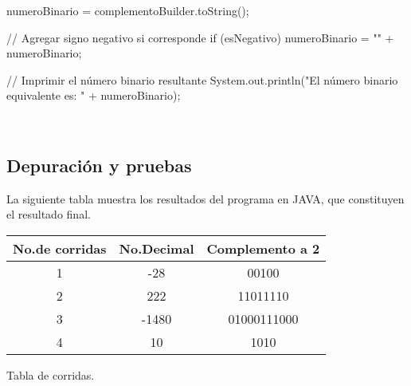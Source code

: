 \begin{javaCode}
{{{{                numeroBinario = complementoBuilder.toString();
            }
        }

        // Agregar signo negativo si corresponde
        if (esNegativo) {
            numeroBinario = "" + numeroBinario;
        }

        // Imprimir el número binario resultante
        System.out.println("El número binario equivalente es: " + numeroBinario);
    }
}
    \end{javaCode}
\\
\subsection{Depuración y pruebas}

La siguiente tabla muestra los resultados del programa en JAVA, que constituyen el resultado final.

\begin{tabular}{|c|c|c|}
  \hline
  \textbf{No.de corridas} & \textbf{No.Decimal} & \textbf{Complemento a 2} \\
  \hline
  1 & -28 & 00100 \\
  \hline
  2 & 222 & 11011110 \\
  \hline
  3 & -1480 & 01000111000 \\
  \hline
  4 & 10 & 1010  \\ 
  \hline
\end{tabular}
\caption{Tabla de corridas.}









